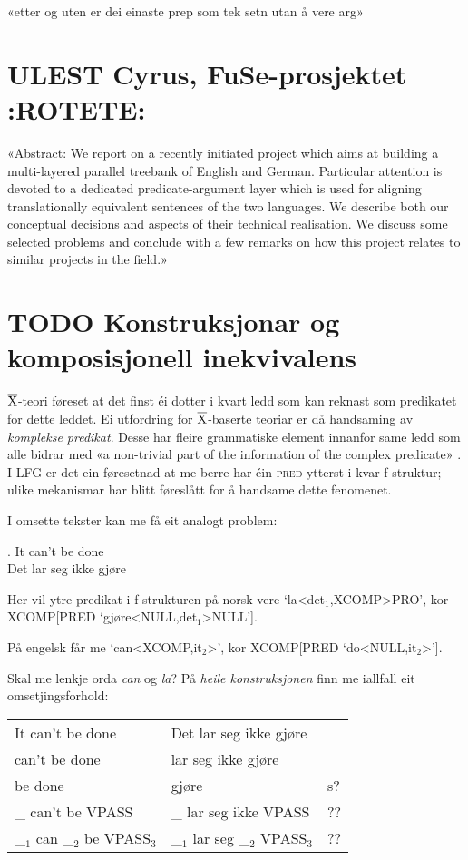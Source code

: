 \documentclass[11pt,a4paper,oneside,draft]{book}
\newcommand{\xbar}{$\rm\overline{X}$}
\begin{document}
«etter og uten er dei einaste prep som tek setn utan å vere arg»
\section{\textbf{ULEST} Cyrus, FuSe-prosjektet \textbf{:ROTETE:}}
\label{sec-3.15}

\citet{cyrus2004apa}
«Abstract: We report on a recently initiated project which aims at
building a multi-layered parallel treebank of English and
German. Particular attention is devoted to a dedicated
predicate-argument layer which is used for aligning translationally
equivalent sentences of the two languages. We describe both our
conceptual decisions and aspects of their technical realisation. We
discuss some selected problems and conclude with a few remarks on how
this project relates to similar projects in the field.»
\section{\textbf{TODO} Konstruksjonar og komposisjonell inekvivalens}
\label{sec-3.16}

\xbar-teori føreset at det finst éi dotter i kvart ledd som kan
reknast som predikatet for dette leddet. Ei utfordring for
\xbar-baserte teoriar er då handsaming av \emph{komplekse predikat}. Desse
har fleire grammatiske element innanfor same ledd som alle bidrar med
«a non-trivial part of the information of the complex predicate»
\citep{alsina1997cp}. I LFG er det ein føresetnad at me berre har éin
\textsc{pred} ytterst i kvar f-struktur; ulike mekanismar har blitt
føreslått for å handsame dette fenomenet.

I omsette tekster kan me få eit analogt problem:

\ex. It can't be done \\
     Det lar seg ikke gjøre

Her vil ytre predikat i f-strukturen på norsk vere
`la<det$_1$,XCOMP>PRO', kor XCOMP[PRED `gjøre<NULL,det$_1$>NULL'].

På engelsk får me `can<XCOMP,it$_2$>', kor
XCOMP[PRED `do<NULL,it$_2$>']. 


Skal me lenkje orda \emph{can} og \emph{la}? På \emph{heile konstruksjonen} finn me
iallfall eit omsetjingsforhold:


\begin{center}
\begin{tabular}{lll}
 It can't be done                    &  Det lar seg ikke gjøre               &      \\
 can't be done                       &  lar seg ikke gjøre                   &      \\
 be done                             &  gjøre                                &  s?  \\
 \_{} can't be VPASS                 &  \_{} lar seg ikke VPASS              &  ??  \\
 \_$_{1}$ can \_$_{2}$ be VPASS$_3$  &  \_$_{1}$ lar seg \_$_{2}$ VPASS$_3$  &  ??  \\
\end{tabular}
\end{center}
\end{document}
